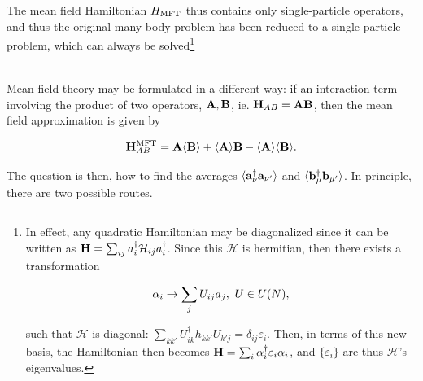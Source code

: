 \documentclass{homework}
\begin{document}
The mean field Hamiltonian $H_{\textnormal{MFT}}$ thus contains only single-particle operators, and thus the original many-body problem has been reduced to a single-particle problem, which can always be solved\footnote{In effect, any quadratic Hamiltonian may be diagonalized since it can be written as ${\bf H} = \sum_{ij} a_i^\dagger {\mathcal{H}}_{ij} a_i^\dagger$. Since this $\bm{ {\mathcal{H}}}$ is hermitian, then there exists a transformation

$$
    {\alpha}_i \rightarrow \sum_{j} U_{ij} a_j, \textnormal{ } U \in U(N),
$$

such that $\bm{ {\mathcal{H}}}$ is diagonal: $\sum_{kk'} U_{ik}^\dagger h_{kk'} U_{k'j} = \delta_{ij} \varepsilon_i$. Then, in terms of this new basis, the Hamiltonian then becomes ${\bf H} = \sum_{i} \alpha_i^\dagger \varepsilon_i \alpha_i$, and $\{\varepsilon_i\}$ are thus  $\bm{ {\mathcal{H}}}$'s eigenvalues.}

\blanky \\

Mean field theory may be formulated in a different way: if an interaction term involving the product of two operators, ${\bf A}, {\bf B}$, ie. ${\bf H}_{AB} = {\bf A} {\bf B}$, then the mean field approximation is given by 

$$
    {\bf H}_{AB}^{\textnormal{MFT}} = {\bf A} \langle{\bf B}\rangle + \langle{\bf A} \rangle{{\bf B}} - \langle{\bf A} \rangle\langle{\bf B} \rangle.
$$

The question is then, how to find the averages $\langle {\bf a}_{\nu}^\dagger {\bf a}_{\nu'} \rangle$ and $\langle {\bf b}_{\mu}^\dagger {\bf b}_{\mu'} \rangle$. In principle, there are two possible routes. 
\end{document}
